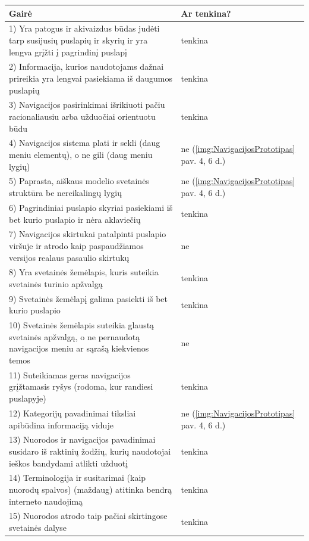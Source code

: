 \documentclass{VUMIFPSbakalaurinis}
\begin{document}
\begin{longtable}{ |p{}|p{}| } 
 \hline
	Gairė & Ar tenkina? \\ \hline
	1) Yra patogus ir akivaizdus būdas judėti tarp susijusių puslapių ir skyrių ir yra lengva grįžti į pagrindinį puslapį & tenkina \\ \hline
	2) Informacija, kurios naudotojams dažnai prireikia yra lengvai pasiekiama iš daugumos puslapių & tenkina \\ \hline
	3) Navigacijos pasirinkimai išrikiuoti pačiu racionaliausiu arba užduočiai orientuotu būdu & tenkina \\ \hline
	4) Navigacijos sistema plati ir sekli (daug meniu elementų), o ne gili (daug meniu lygių)  & ne (\ref{img:NavigacijosPrototipas} pav. 4, 6 d.) \\ \hline
	5) Paprasta, aiškaus modelio svetainės struktūra be nereikalingų lygių & ne (\ref{img:NavigacijosPrototipas} pav. 4, 6 d.) \\ \hline
	6) Pagrindiniai puslapio skyriai pasiekiami iš bet kurio puslapio ir nėra aklaviečių & tenkina \\ \hline
	7) Navigacijos skirtukai patalpinti puslapio viršuje ir atrodo kaip paspaudžiamos versijos realaus pasaulio skirtukų & ne \\ \hline
	8) Yra svetainės žemėlapis, kuris suteikia svetainės turinio apžvalgą & tenkina \\ \hline
	9) Svetainės žemėlapį galima pasiekti iš bet kurio puslapio & tenkina \\ \hline
	10) Svetainės žemėlapis suteikia glaustą svetainės apžvalgą, o ne pernaudotą navigacijos meniu ar sąrašą kiekvienos temos & ne \\ \hline
	11) Suteikiamas geras navigacijos grįžtamasis ryšys (rodoma, kur randiesi puslapyje) & tenkina \\ \hline
	12) Kategorijų pavadinimai tiksliai apibūdina informaciją viduje & ne (\ref{img:NavigacijosPrototipas} pav. 4, 6 d.) \\ \hline
	13) Nuorodos ir navigacijos pavadinimai susidaro iš raktinių žodžių, kurių naudotojai ieškos bandydami atlikti užduotį & tenkina \\ \hline
	14) Terminologija ir susitarimai (kaip nuorodų spalvos) (maždaug) atitinka bendrą interneto naudojimą & tenkina \\ \hline
	15) Nuorodos atrodo taip pačiai skirtingose svetainės dalyse & tenkina \\ \hline

\end{longtable}
\end{document}
